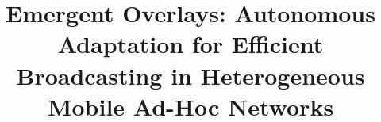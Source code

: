 \documentclass[sigplan, anonymous]{acmart}
\begin{document}
\title{Emergent Overlays: Autonomous Adaptation for Efficient Broadcasting in Heterogeneous Mobile Ad-Hoc Networks}
\renewcommand{\shorttitle}{Emergent overlays: Adaptation for broadcasting in MANETs}

%
\end{document}

